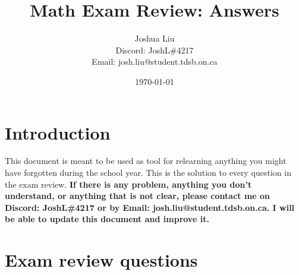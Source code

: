 \documentclass[paper=a4, fontsize=11pt]{scrartcl}
\title{Math Exam Review: Answers}
\author{Joshua Liu\\
Discord: JoshL\#4217\\ %
Email: josh.liu@student.tdsb.on.ca}
\date{\today}
\begin{document}
\maketitle
\section{Introduction}
This document is meant to be used as tool for relearning anything you might have forgotten during the school year. This is the solution to every question in the exam review. \textbf{If there is any problem, anything you don't understand, or anything that is not clear, please contact me on Discord: JoshL\#4217 or by Email: josh.liu@student.tdsb.on.ca. I will be able to update this document and improve it.}
\section{Exam review questions}
\end{document}

